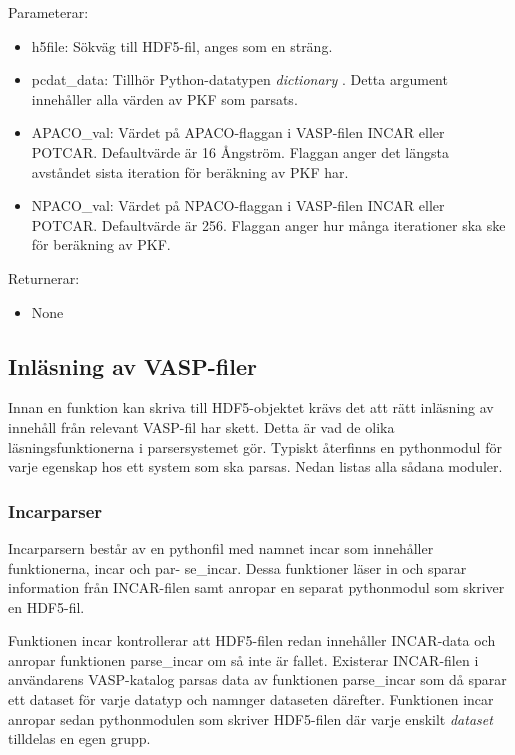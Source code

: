 Parameterar: 
\begin{itemize}
    \setlength\itemsep{0em}
    \item h5file: Sökväg till HDF5-fil, anges som en sträng.
    \item pcdat\_data: Tillhör Python-datatypen \textit{dictionary} \cite{dict}. Detta argument innehåller alla värden av PKF som parsats.
    \item APACO\_val: Värdet på APACO-flaggan i VASP-filen INCAR eller POTCAR. Defaultvärde är 16 Ångström. Flaggan anger det längsta avståndet sista iteration för beräkning av PKF har.     
    \item NPACO\_val: Värdet på NPACO-flaggan i VASP-filen INCAR eller POTCAR. Defaultvärde är 256. Flaggan anger hur många iterationer ska ske för beräkning av PKF.      
\end{itemize}

Returnerar: 
\begin{itemize}
    \item None 
\end{itemize}

\subsection{Inläsning av VASP-filer} \label{ssec:inläsning av VASP}
Innan en funktion kan skriva till HDF5-objektet krävs det att rätt inläsning av innehåll från relevant VASP-fil har skett. Detta är vad de olika läsningsfunktionerna i parsersystemet gör. Typiskt återfinns en pythonmodul för varje egenskap hos ett system som ska parsas. Nedan listas alla sådana moduler.

\subsubsection{Incarparser}
Incarparsern består av en pythonfil med namnet incar som innehåller funktionerna, incar och par- se\_incar. Dessa funktioner läser in och sparar information från INCAR-filen samt anropar en separat pythonmodul som skriver en HDF5-fil. 

Funktionen incar kontrollerar att HDF5-filen redan innehåller INCAR-data och anropar funktionen parse\_incar om så inte är fallet. Existerar INCAR-filen i användarens VASP-katalog parsas data av funktionen parse\_incar som då sparar ett dataset för varje datatyp och namnger dataseten därefter. Funktionen incar anropar sedan pythonmodulen som skriver HDF5-filen där varje enskilt \textit{dataset} tilldelas en egen grupp. 

